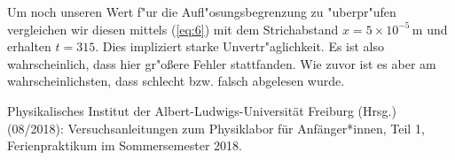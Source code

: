 \documentclass[11pt,a4paper]{article}
\begin{document}
Um noch unseren Wert f"ur die Aufl"osungsbegrenzung zu "uberpr"ufen vergleichen wir diesen mittels (\ref{eq:6}) mit dem Strichabstand $x=5\times10^{-5}\,$m und erhalten $t=315$. Dies impliziert starke Unvertr"aglichkeit. Es ist also wahrscheinlich, dass hier gr"o\ss ere Fehler stattfanden. Wie zuvor ist es aber am wahrscheinlichsten, dass schlecht bzw. falsch abgelesen wurde.

\pagebreak

%


\begin{thebibliography}{9}
 Physikalisches Institut der Albert-Ludwigs-Universität Freiburg (Hrsg.) (08/2018): Versuchsanleitungen zum Physiklabor für Anfänger*innen, Teil 1, Ferienpraktikum im Sommersemester 2018.
\end{thebibliography}
\end{document}
